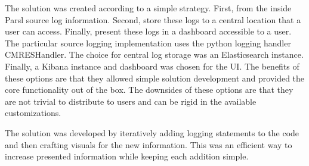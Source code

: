 The solution was created according to a simple strategy.
First, from the inside Parsl source log information.
Second, store these logs to a central location that a user can access.
Finally, present these logs in a dashboard accessible to a user.
The particular source logging implementation uses the python logging handler CMRESHandler.
The choice for central log storage was an Elasticsearch instance.
Finally, a Kibana instance and dashboard was chosen for the UI.
The benefits of these options are that they allowed simple solution development and provided the core functionality out of the box.
The downsides of these options are that they are not trivial to distribute to users and can be rigid in the available customizations.

The solution was developed by iteratively adding logging statements to the code and then crafting visuals for the new information.
This was an efficient way to increase presented information while keeping each addition simple.
